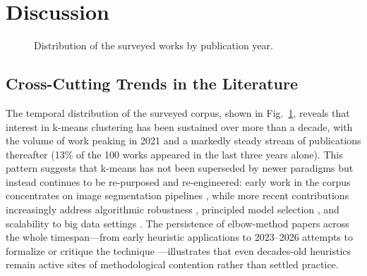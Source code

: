\section{Discussion}\label{sec:discussion}
\begin{figure}[!t]
\centering
{}
\caption{Distribution of the surveyed works by publication year.}
\label{fig:years}
\end{figure}
\subsection{Cross-Cutting Trends in the Literature}
The temporal distribution of the surveyed corpus, shown in Fig.~\ref{fig:years}, reveals that interest in k-means clustering has been sustained over more than a decade, with the volume of work peaking in 2021 and a markedly steady stream of publications thereafter (13\% of the 100 works appeared in the last three years alone). This pattern suggests that k-means has not been superseded by newer paradigms but instead continues to be re-purposed and re-engineered: early work in the corpus concentrates on image segmentation pipelines \cite{dhanachandra2015image,wang2016method,shrivastava2014medical,suganya2013image}, while more recent contributions increasingly address algorithmic robustness \cite{khan2024addressing,xiao2024comprehensive}, principled model selection \cite{schubert2023stop,herdiana2026more,shi2021quantitative}, and scalability to big data settings \cite{mussabayev2025bimodalclust,mussabayev2023comparative}. The persistence of elbow-method papers across the whole timespan---from early heuristic applications \cite{syakur2018integration} to 2023--2026 attempts to formalize or critique the technique \cite{shi2021quantitative,herdiana2026more,schubert2023stop}---illustrates that even decades-old heuristics remain active sites of methodological contention rather than settled practice.

